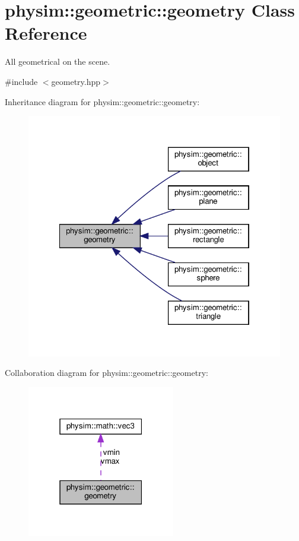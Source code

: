 \hypertarget{classphysim_1_1geometric_1_1geometry}{}\section{physim\+:\+:geometric\+:\+:geometry Class Reference}
\label{classphysim_1_1geometric_1_1geometry}


All geometrical on the scene.  




{\ttfamily \#include $<$geometry.\+hpp$>$}



Inheritance diagram for physim\+:\+:geometric\+:\+:geometry\+:\nopagebreak
\begin{figure}[H]
\begin{center}
\leavevmode
\includegraphics[width=322pt]{classphysim_1_1geometric_1_1geometry__inherit__graph}
\end{center}
\end{figure}


Collaboration diagram for physim\+:\+:geometric\+:\+:geometry\+:\nopagebreak
\begin{figure}[H]
\begin{center}
\leavevmode
\includegraphics[width=183pt]{classphysim_1_1geometric_1_1geometry__coll__graph}
\end{center}
\end{figure}
